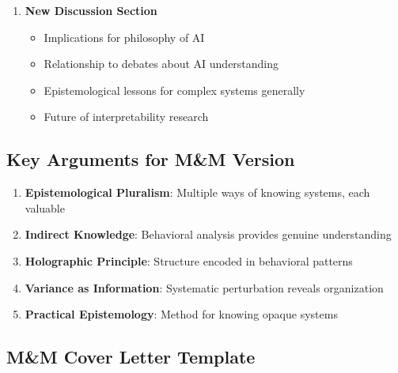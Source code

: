 \documentclass[12pt]{article}
\begin{document}
\begin{enumerate}[leftmargin=*]
\item \textbf{New Discussion Section}
\begin{itemize}
\item Implications for philosophy of AI
\item Relationship to debates about AI understanding
\item Epistemological lessons for complex systems generally
\item Future of interpretability research
\end{itemize}
\end{enumerate}

\subsection{Key Arguments for M\&M Version}

\begin{enumerate}[leftmargin=*]
\item \textbf{Epistemological Pluralism}: Multiple ways of knowing systems, each valuable
\item \textbf{Indirect Knowledge}: Behavioral analysis provides genuine understanding
\item \textbf{Holographic Principle}: Structure encoded in behavioral patterns
\item \textbf{Variance as Information}: Systematic perturbation reveals organization
\item \textbf{Practical Epistemology}: Method for knowing opaque systems
\end{enumerate}

\subsection{M\&M Cover Letter Template}
\end{document}
